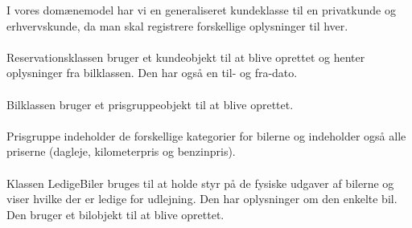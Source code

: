 \documentclass[11pt]{article}
\begin{document}
I vores domænemodel har vi en generaliseret kundeklasse til en privatkunde og erhvervskunde, da man skal registrere forskellige oplysninger til hver.\\\\
Reservationsklassen bruger et kundeobjekt til at blive oprettet og henter oplysninger fra bilklassen. Den har også en til- og fra-dato.\\\\
Bilklassen bruger et prisgruppeobjekt til at blive oprettet.\\\\
Prisgruppe indeholder de forskellige kategorier for bilerne og indeholder også alle priserne (dagleje, kilometerpris og benzinpris).\\\\
Klassen LedigeBiler bruges til at holde styr på de fysiske udgaver af bilerne og viser hvilke der er ledige for udlejning. Den har oplysninger om den enkelte bil. Den bruger et bilobjekt til at blive oprettet.
\end{document}
